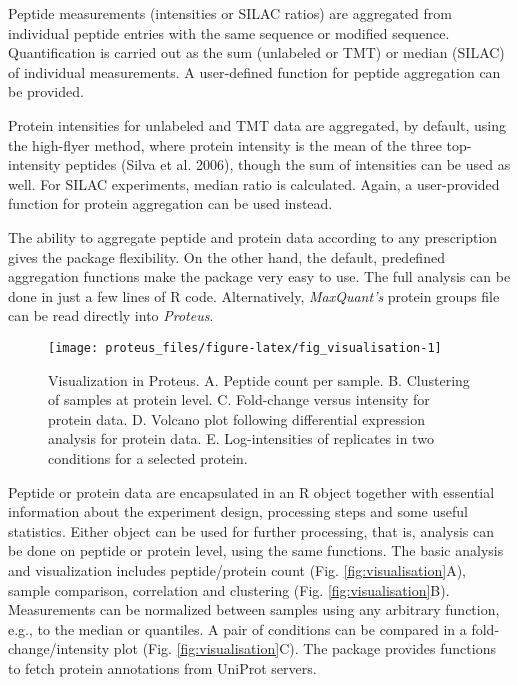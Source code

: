 \documentclass[]{article}
\begin{document}
Peptide measurements (intensities or SILAC ratios) are aggregated from
individual peptide entries with the same sequence or modified sequence.
Quantification is carried out as the sum (unlabeled or TMT) or median
(SILAC) of individual measurements. A user-defined function for peptide
aggregation can be provided.

Protein intensities for unlabeled and TMT data are aggregated, by
default, using the high-flyer method, where protein intensity is the
mean of the three top-intensity peptides (Silva et al. 2006), though the
sum of intensities can be used as well. For SILAC experiments, median
ratio is calculated. Again, a user-provided function for protein
aggregation can be used instead.

The ability to aggregate peptide and protein data according to any
prescription gives the package flexibility. On the other hand, the
default, predefined aggregation functions make the package very easy to
use. The full analysis can be done in just a few lines of R code.
Alternatively, \emph{MaxQuant's} protein groups file can be read
directly into \emph{Proteus}.

\begin{figure}[H]

{\centering \texttt{[image: proteus\_files/figure-latex/fig\_visualisation-1]} 

}

\caption{\label{fig:visualisation}Visualization in Proteus. A. Peptide count per sample. B. Clustering of samples at protein level. C. Fold-change versus intensity for protein data. D. Volcano plot following differential expression analysis for protein data. E. Log-intensities of replicates in two conditions for a selected protein.}\label{fig:fig_visualisation}
\end{figure}

Peptide or protein data are encapsulated in an R object together with
essential information about the experiment design, processing steps and
some useful statistics. Either object can be used for further
processing, that is, analysis can be done on peptide or protein level,
using the same functions. The basic analysis and visualization includes
peptide/protein count (Fig. \ref{fig:visualisation}A), sample
comparison, correlation and clustering (Fig. \ref{fig:visualisation}B).
Measurements can be normalized between samples using any arbitrary
function, e.g., to the median or quantiles. A pair of conditions can be
compared in a fold-change/intensity plot (Fig.
\ref{fig:visualisation}C). The package provides functions to fetch
protein annotations from UniProt servers.
\end{document}
